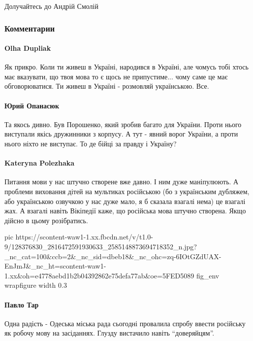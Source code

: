 Долучайтесь до Андрій Смолій

\subsubsection{Комментарии}

\paragraph{Olha Dupliak}

Як прикро. Коли ти живеш в Україні, народився в Україні, але чомусь тобі хтось
має вказувати, що твоя мова то є щось не припустиме... чому саме це має
обговорюватися. Ти живеш в Україні - розмовляй українською. Все.

\paragraph{Юрий Опанасюк}

Та якось дивно.  Був Порошенко, який зробив багато для України. Проти нього
виступали якісь дружинники з корпусу.  А тут - явний ворог України, а проти
нього ніхто не виступає.  То де бійці за правду і Україну?

\paragraph{Kateryna Polezhaka}

Питання мови у нас штучно створене вже давно. І ним дуже маніпулюють.  А
проблеми виховання дітей на мультиках російською (бо з українським дубляжем, або
українською озвучкою у нас дуже мало, я б сказала взагалі нема) це взагалі жах.
А взагалі навіть Вікіпедії каже, що російська мова штучно створена. Якщо дійсно
в цьому розібратись. 

\ifcmt
pic https://scontent-waw1-1.xx.fbcdn.net/v/t1.0-9/128376830_2816472591930633_2585148873694718352_n.jpg?_nc_cat=100&ccb=2&_nc_sid=dbeb18&_nc_ohc=zq-6IOtGZdUAX-EnJmJ&_nc_ht=scontent-waw1-1.xx&oh=e4778aebd1b2b04392862e75defa77ab&oe=5FED5089
fig_env wrapfigure
width 0.3
\fi

\paragraph{Павло Тар}

Одна радість - Одеська міська рада сьогодні провалила спробу ввести російську
як робочу мову на засіданнях. Глузду вистачило навіть \enquote{доверяйцям}.

